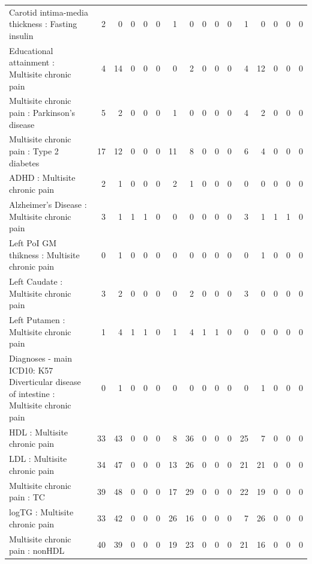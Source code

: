 \begin{table}[ht]
\begin{tabular}{lrrrrrrrrrrrrrrr}
  Carotid intima-media thickness : Fasting insulin &   2 &   0 &   0 &   0 &   0 &   1 &   0 &   0 &   0 &   0 &   1 &   0 &   0 &   0 &   0 \\ 
  Educational attainment : Multisite chronic pain &   4 &  14 &   0 &   0 &   0 &   0 &   2 &   0 &   0 &   0 &   4 &  12 &   0 &   0 &   0 \\ 
  Multisite chronic pain : Parkinson's disease &   5 &   2 &   0 &   0 &   0 &   1 &   0 &   0 &   0 &   0 &   4 &   2 &   0 &   0 &   0 \\ 
  Multisite chronic pain : Type 2 diabetes &  17 &  12 &   0 &   0 &   0 &  11 &   8 &   0 &   0 &   0 &   6 &   4 &   0 &   0 &   0 \\ 
  ADHD : Multisite chronic pain &   2 &   1 &   0 &   0 &   0 &   2 &   1 &   0 &   0 &   0 &   0 &   0 &   0 &   0 &   0 \\ 
  Alzheimer's Disease : Multisite chronic pain &   3 &   1 &   1 &   1 &   0 &   0 &   0 &   0 &   0 &   0 &   3 &   1 &   1 &   1 &   0 \\ 
  Left PoI GM thikness : Multisite chronic pain &   0 &   1 &   0 &   0 &   0 &   0 &   0 &   0 &   0 &   0 &   0 &   1 &   0 &   0 &   0 \\ 
  Left Caudate : Multisite chronic pain &   3 &   2 &   0 &   0 &   0 &   0 &   2 &   0 &   0 &   0 &   3 &   0 &   0 &   0 &   0 \\ 
  Left Putamen : Multisite chronic pain &   1 &   4 &   1 &   1 &   0 &   1 &   4 &   1 &   1 &   0 &   0 &   0 &   0 &   0 &   0 \\ 
  Diagnoses - main ICD10: K57 Diverticular disease of intestine : Multisite chronic pain &   0 &   1 &   0 &   0 &   0 &   0 &   0 &   0 &   0 &   0 &   0 &   1 &   0 &   0 &   0 \\ 
  HDL : Multisite chronic pain &  33 &  43 &   0 &   0 &   0 &   8 &  36 &   0 &   0 &   0 &  25 &   7 &   0 &   0 &   0 \\ 
  LDL : Multisite chronic pain &  34 &  47 &   0 &   0 &   0 &  13 &  26 &   0 &   0 &   0 &  21 &  21 &   0 &   0 &   0 \\ 
  Multisite chronic pain : TC &  39 &  48 &   0 &   0 &   0 &  17 &  29 &   0 &   0 &   0 &  22 &  19 &   0 &   0 &   0 \\ 
  logTG : Multisite chronic pain &  33 &  42 &   0 &   0 &   0 &  26 &  16 &   0 &   0 &   0 &   7 &  26 &   0 &   0 &   0 \\ 
  Multisite chronic pain : nonHDL &  40 &  39 &   0 &   0 &   0 &  19 &  23 &   0 &   0 &   0 &  21 &  16 &   0 &   0 &   0 \\ 

\end{tabular}
\end{table}
